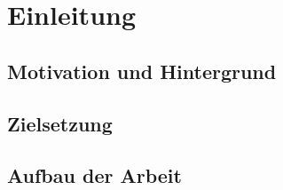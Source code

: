 
\chapter{Einleitung}

\section{Motivation und Hintergrund}

\section{Zielsetzung}

\section{Aufbau der Arbeit}


